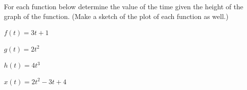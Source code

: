 \begin{problem}
\item For each function below determine the value of the time given
  the height of the graph of the function. (Make a sketch of the plot
  of each function as well.)

  \begin{subproblem}
  \item $f(t)=3t+1$
    \vfill
  \item $g(t)=2t^2$
    \vfill
  \item $h(t)=4t^3$
    \vfill
  \item $x(t)=2t^2 - 3t + 4$
    \vfill
  \end{subproblem}


  \vfill

\end{problem}






